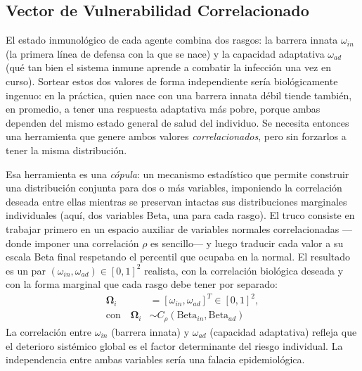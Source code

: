 \documentclass[conference]{IEEEtran}
\begin{document}
\subsection{Vector de Vulnerabilidad Correlacionado}
El estado inmunológico de cada agente combina dos rasgos: la barrera innata $\omega_{in}$ (la primera línea de defensa con la que se nace) y la capacidad adaptativa $\omega_{ad}$ (qué tan bien el sistema inmune aprende a combatir la infección una vez en curso). Sortear estos dos valores de forma independiente sería biológicamente ingenuo: en la práctica, quien nace con una barrera innata débil tiende también, en promedio, a tener una respuesta adaptativa más pobre, porque ambas dependen del mismo estado general de salud del individuo. Se necesita entonces una herramienta que genere ambos valores \emph{correlacionados}, pero sin forzarlos a tener la misma distribución.

Esa herramienta es una \emph{cópula}: un mecanismo estadístico que permite construir una distribución conjunta para dos o más variables, imponiendo la correlación deseada entre ellas mientras se preservan intactas sus distribuciones marginales individuales (aquí, dos variables Beta, una para cada rasgo). El truco consiste en trabajar primero en un espacio auxiliar de variables normales correlacionadas ---donde imponer una correlación $\rho$ es sencillo--- y luego traducir cada valor a su escala Beta final respetando el percentil que ocupaba en la normal. El resultado es un par $(\omega_{in}, \omega_{ad})\in[0,1]^2$ realista, con la correlación biológica deseada y con la forma marginal que cada rasgo debe tener por separado:
\begin{equation}
\begin{split}
\mathbf{\Omega}_i &= [\omega_{in}, \omega_{ad}]^T \in [0,1]^2, \\
\text{con} \quad \mathbf{\Omega}_i &\sim C_\rho(\text{Beta}_{in}, \text{Beta}_{ad})
\end{split}
\end{equation}
La correlación entre $\omega_{in}$ (barrera innata) y $\omega_{ad}$ (capacidad adaptativa) refleja que el deterioro sistémico global es el factor determinante del riesgo individual. La independencia entre ambas variables sería una falacia epidemiológica.
\end{document}
